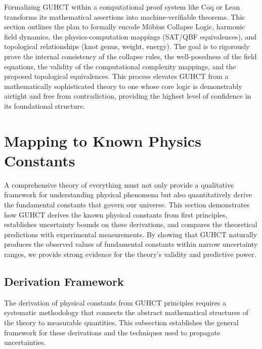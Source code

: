 \documentclass[11pt,a4paper]{article}
\begin{document}
\begin{intuitivesummary}
Formalizing GUHCT within a computational proof system like Coq or Lean transforms its mathematical assertions into machine-verifiable theorems. This section outlines the plan to formally encode M\"obius Collapse Logic, harmonic field dynamics, the physics-computation mappings (SAT/QBF equivalences), and topological relationships (knot genus, weight, energy). The goal is to rigorously prove the internal consistency of the collapse rules, the well-posedness of the field equations, the validity of the computational complexity mappings, and the proposed topological equivalences. This process elevates GUHCT from a mathematically sophisticated theory to one whose core logic is demonstrably airtight and free from contradiction, providing the highest level of confidence in its foundational structure.
\end{intuitivesummary}







\section{Mapping to Known Physics Constants}
\label{sec:physics_constants}

A comprehensive theory of everything must not only provide a qualitative framework for understanding physical phenomena but also quantitatively derive the fundamental constants that govern our universe. This section demonstrates how GUHCT derives the known physical constants from first principles, establishes uncertainty bounds on these derivations, and compares the theoretical predictions with experimental measurements. By showing that GUHCT naturally produces the observed values of fundamental constants within narrow uncertainty ranges, we provide strong evidence for the theory's validity and predictive power.

\subsection{Derivation Framework}
\label{subsec:derivation_framework}

The derivation of physical constants from GUHCT principles requires a systematic methodology that connects the abstract mathematical structures of the theory to measurable quantities. This subsection establishes the general framework for these derivations and the techniques used to propagate uncertainties.
\end{document}
